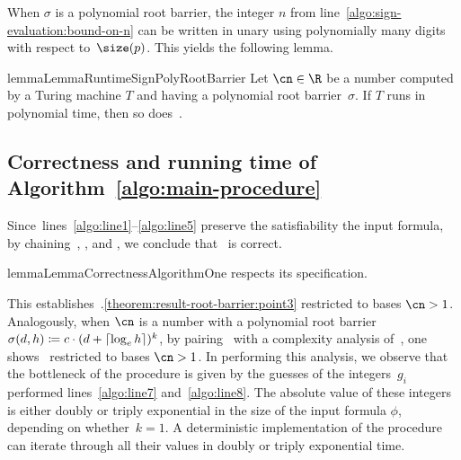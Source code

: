 When $\sigma$ is a polynomial root barrier, the integer $n$ from
line~\ref{algo:sign-evaluation:bound-on-n} can be written in unary using
polynomially many digits with respect to~$\size(p)$. This yields the following
lemma.

\begin{restatable}{lemma}{LemmaRuntimeSignPolyRootBarrier}
  \label{lemma:runtime-sign-poly-root-barrier}
  Let $\cn \in \R$ be a number computed by a Turing machine $T$ and having a polynomial
  root barrier~$\sigma$. If $T$ runs in polynomial time, then so
  does~.
\end{restatable}

\subsection{Correctness and running time of Algorithm~\ref{algo:main-procedure}}
\label{subsection:correctness-algorithm}

Since~lines~\ref{algo:line1}--\ref{algo:line5} preserve the satisfiability the
input formula, by chaining~,
, and , we
conclude that~ is correct. 
\begin{restatable}{lemma}{LemmaCorrectnessAlgorithmOne}
  \label{lemma:correctness-algorithm-1}
   respects its specification.
\end{restatable}
This
establishes~.\ref{theorem:result-root-barrier:point3}
restricted to bases $\cn > 1$. Analogously, when $\cn$ is a number with a
polynomial root barrier~$\sigma(d,h) \coloneqq {c \cdot (d + \ensuremath{\left\lceil\log_e
h\right\rceil})^k}$, by pairing~ with a complexity
analysis of~, one
shows~ restricted to bases $\cn > 1$.
In performing this analysis, we observe that the bottleneck of the procedure is
given by the guesses of the integers~$g_i$ performed lines~\ref{algo:line7}
and~\ref{algo:line8}. The absolute value of these integers is either doubly or
triply exponential in the size of the input formula $\phi$, depending on
whether~$k=1$. A deterministic
implementation of the procedure can iterate through all their values in doubly
or triply exponential time.

